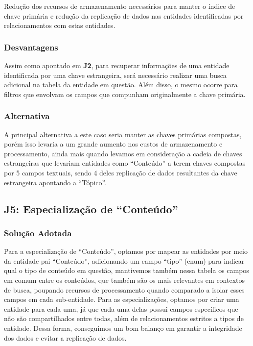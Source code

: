 Redução dos recursos de armazenamento necessários para manter o índice de chave
primária e redução da replicação de dados nas entidades identificadas por
relacionamentos com estas entidades.

\subsubsection{Desvantagens}

Assim como apontado em \textbf{J2}, para recuperar informações de uma entidade
identificada por uma chave estrangeira, será necessário realizar uma busca
adicional na tabela da entidade em questão. Além disso, o mesmo ocorre para
filtros que envolvam os campos que compunham originalmente a chave primária.

\subsubsection{Alternativa}

A principal alternativa a este caso seria manter as chaves primárias compostas,
porém isso levaria a um grande aumento nos custos de armazenamento e
processamento, ainda mais quando levamos em consideração a cadeia de chaves
estrangeiras que levariam entidades como ``Conteúdo'' a terem chaves compostas
por 5 campos textuais, sendo 4 deles replicação de dados resultantes da chave
estrangeira apontando a ``Tópico''.

\subsection{\textbf{J5:} Especialização de ``Conteúdo''}

\subsubsection{Solução Adotada}

Para a especialização de ``Conteúdo'', optamos por mapear as entidades por meio
da entidade pai ``Conteúdo'', adicionando um campo ``tipo'' (enum) para indicar
qual o tipo de conteúdo em questão, mantivemos também nessa tabela os campos em
comum entre os conteúdos, que também são os mais relevantes em contextos de
busca, poupando recursos de processamento quando comparado a isolar esses
campos em cada sub-entidade. Para as especializações, optamos por criar uma
entidade para cada uma, já que cada uma delas possui campos específicos que não
são compartilhados entre todas, além de relacionamentos estritos a tipos de
entidade. Dessa forma, conseguimos um bom balanço em garantir a integridade dos
dados e evitar a replicação de dados. 

